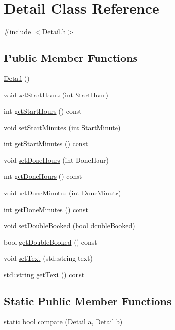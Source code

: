 \hypertarget{classDetail}{\section{Detail Class Reference}
\label{classDetail}
}


{\ttfamily \#include $<$Detail.\-h$>$}

\subsection*{Public Member Functions}
\begin{DoxyCompactItemize}
\item 
\hyperlink{classDetail_ade0deea5232733e7bdb658dadcc6b5fe}{Detail} ()
\item 
void \hyperlink{classDetail_ad62d325e64479e4e48f994bc0ef63874}{set\-Start\-Hours} (int Start\-Hour)
\item 
int \hyperlink{classDetail_a7e50f64f712a2775f4bfca3d5ca408d5}{get\-Start\-Hours} () const 
\item 
void \hyperlink{classDetail_a9272fb5c632df14c480a4e0065b5cc92}{set\-Start\-Minutes} (int Start\-Minute)
\item 
int \hyperlink{classDetail_ae7a56cb0c31323a94aea889f7b8790b8}{get\-Start\-Minutes} () const 
\item 
void \hyperlink{classDetail_af539d10fd24811f7d68bdf236a6feda0}{set\-Done\-Hours} (int Done\-Hour)
\item 
int \hyperlink{classDetail_a495a656ee4869f2dac3c27bc8105a606}{get\-Done\-Hours} () const 
\item 
void \hyperlink{classDetail_aad257615ab5ad0cb4447e677c547bd13}{set\-Done\-Minutes} (int Done\-Minute)
\item 
int \hyperlink{classDetail_a1ec3b7b3f3b2b8d587e2e55625288185}{get\-Done\-Minutes} () const 
\item 
void \hyperlink{classDetail_a3c4c2777819074375234980889aa4f1e}{set\-Double\-Booked} (bool double\-Booked)
\item 
bool \hyperlink{classDetail_a63624d1a3d099fa76cf776a00902d3e0}{get\-Double\-Booked} () const 
\item 
void \hyperlink{classDetail_afb3373c8d4361f64e39d29a70a7dcf98}{set\-Text} (std\-::string text)
\item 
std\-::string \hyperlink{classDetail_a8bb858933394ae9b854fbca7ce4db9cf}{get\-Text} () const 
\end{DoxyCompactItemize}
\subsection*{Static Public Member Functions}
\begin{DoxyCompactItemize}
\item 
static bool \hyperlink{classDetail_a23e6afc6f70c31bdcc064461b80ea44c}{compare} (\hyperlink{classDetail}{Detail} a, \hyperlink{classDetail}{Detail} b)
\end{DoxyCompactItemize}


